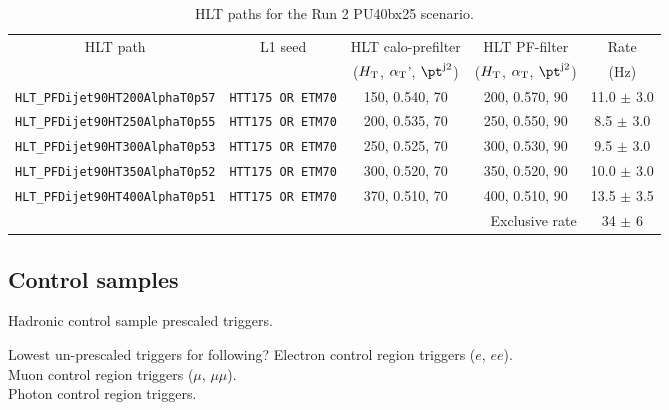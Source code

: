 \begin{table}[h!]
\footnotesize
\centering
\begin{tabular}{|c||c|c|c||c|} 
\hline
HLT path & L1 seed & HLT calo-prefilter                      & HLT PF-filter                          & Rate \\[0.7 ex] 
         &         & ($\mbox{$H_\text{T}$}$, $\alpha_{\text{T}}$', $\pt^{\rm j2}$) & ($\mbox{$H_\text{T}$}$, $\alpha_{\text{T}}$, $\pt^{\rm j2}$) & (Hz) \\[0.7 ex] 
\hline
\verb!HLT_PFDijet90HT200AlphaT0p57! & \verb!HTT175 OR ETM70! & 150, 0.540, 70 & 200, 0.570, 90 & 11.0 $\pm$ 3.0 \\
\verb!HLT_PFDijet90HT250AlphaT0p55! & \verb!HTT175 OR ETM70! & 200, 0.535, 70 & 250, 0.550, 90 & 8.5  $\pm$ 3.0 \\
\verb!HLT_PFDijet90HT300AlphaT0p53! & \verb!HTT175 OR ETM70! & 250, 0.525, 70 & 300, 0.530, 90 & 9.5  $\pm$ 3.0 \\
\verb!HLT_PFDijet90HT350AlphaT0p52! & \verb!HTT175 OR ETM70! & 300, 0.520, 70 & 350, 0.520, 90 & 10.0 $\pm$ 3.0 \\
\verb!HLT_PFDijet90HT400AlphaT0p51! & \verb!HTT175 OR ETM70! & 370, 0.510, 70 & 400, 0.510, 90 & 13.5 $\pm$ 3.5 \\
\hline
\multicolumn{4}{|r||}{Exclusive rate} & 34 $\pm$ 6 \\
\hline


\end{tabular}
\caption{HLT paths for the Run 2 PU40bx25 scenario. }
\label{tab:2015_Hadronic_Triggers}
\end{table}




\subsection{Control samples}
Hadronic control sample prescaled triggers.

Lowest un-prescaled triggers for following?
Electron control region triggers ($e$, $ee$). \\
Muon control region triggers ($\mu$, $\mu\mu$).\\
Photon control region triggers.\\



